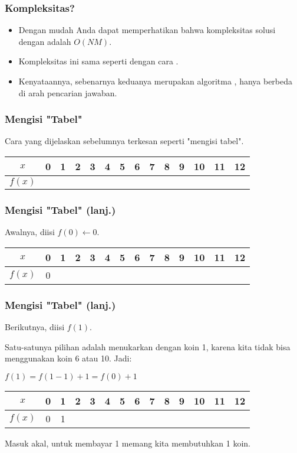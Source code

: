 \begin{frame} 
\frametitle{Kompleksitas?}
\begin{itemize}
  \item Dengan mudah Anda dapat memperhatikan bahwa kompleksitas solusi dengan \fbottomup adalah $O(NM)$.
  \item Kompleksitas ini sama seperti dengan cara \ftopdown.
  \item Kenyataannya, sebenarnya keduanya merupakan algoritma , hanya berbeda di arah pencarian jawaban.
\end{itemize}
\end{frame}

\begin{frame}
\frametitle{Mengisi "Tabel"}
Cara \fbottomup yang dijelaskan sebelumnya terkesan seperti "mengisi tabel".\newline

\begin{tabular}{|c|c|c|c|c|c|c|c|c|c|c|c|c|c|}
\hline $x$ & 0 & 1 & 2 & 3 & 4 & 5 & 6 & 7 & 8 & 9 & 10 & 11 & 12 \\ 
\hline $f(x)$ &  &  &  &  &  &  &  &  &  &  & & & \\ 
\hline 
\end{tabular} 
\end{frame}

\begin{frame}
\frametitle{Mengisi "Tabel" (lanj.)}
Awalnya, diisi $f(0) \gets 0$.\newline

\begin{tabular}{|c|c|c|c|c|c|c|c|c|c|c|c|c|c|}
\hline $x$ & 0 & 1 & 2 & 3 & 4 & 5 & 6 & 7 & 8 & 9 & 10 & 11 & 12 \\ 
\hline $f(x)$ &  0 &  &  &  &  &  &  &  &  &  & & & \\ 
\hline 
\end{tabular} 
\end{frame}

\begin{frame}
\frametitle{Mengisi "Tabel" (lanj.)}
Berikutnya, diisi $f(1)$.

Satu-satunya pilihan adalah menukarkan dengan koin 1, karena kita tidak bisa menggunakan koin 6 atau 10. Jadi:

$f(1) = f(1-1) + 1 = f(0) + 1$
\newline

\begin{tabular}{|c|c|c|c|c|c|c|c|c|c|c|c|c|c|}
\hline $x$ & 0 & 1 & 2 & 3 & 4 & 5 & 6 & 7 & 8 & 9 & 10 & 11 & 12 \\ 
\hline $f(x)$ &  0 & 1 &  &  &  &  &  &  &  &  & & & \\ 
\hline 
\end{tabular} 
\newline \newline \newline Masuk akal, untuk membayar 1 memang kita membutuhkan 1 koin.
\end{frame}

